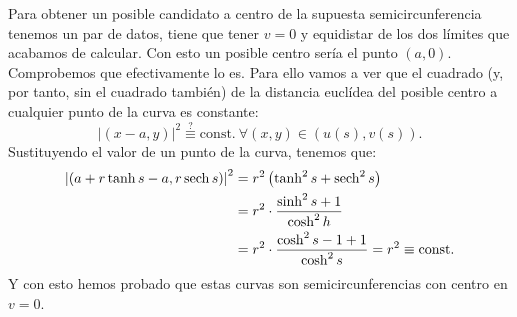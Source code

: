 Para obtener un posible candidato a centro de la supuesta semicircunferencia
tenemos un par de datos, tiene que tener $v = 0$ y equidistar de los dos límites
que acabamos de calcular. Con esto un posible centro sería el punto $\left( a, 0
\right)$. Comprobemos que efectivamente lo es. Para ello vamos a ver que el
cuadrado (y, por tanto, sin el cuadrado también) de la distancia euclídea del
posible centro a cualquier punto de la curva es constante:
\[
\left\lvert \left( x - a , y \right) \right\rvert^2 \stackrel{?}{\equiv}
\mathrm{const.}\ \forall \left( x, y \right) \in \left( u\left( s \right), v\left( s
\right) \right).
\]
Sustituyendo el valor de un punto de la curva, tenemos que:
\begin{align*}
    \left\lvert \left( a + r \tanh s - a, r \operatorname{sech} s \right) \right\rvert^2 &=
    r^2 \left( \tanh^2 s + \operatorname{sech}^2 s \right)\\ 
    &= r^2 \cdot \frac{\sinh^2 s + 1}{\cosh^2 h}\\
    &= r^2 \cdot \frac{\cosh^2 s - 1 + 1}{\cosh^2 s} = r^2 \equiv \mathrm{const.}
\end{align*}
Y con esto hemos probado que estas curvas son semicircunferencias con centro
en $v = 0$.

